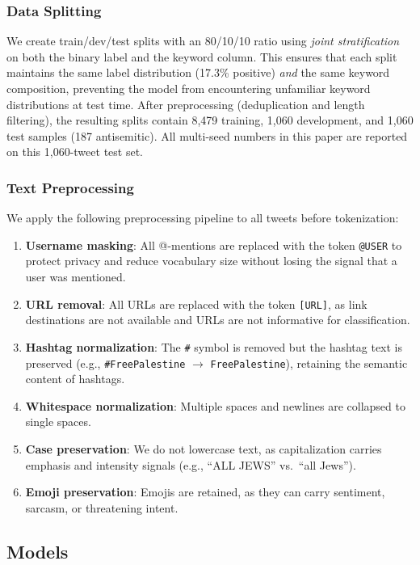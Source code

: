 \documentclass[10pt,a4paper]{article}
\begin{document}
\subsubsection{Data Splitting}

We create train/dev/test splits with an 80/10/10 ratio using \emph{joint stratification} on both the binary label and the keyword column. This ensures that each split maintains the same label distribution (17.3\% positive) \emph{and} the same keyword composition, preventing the model from encountering unfamiliar keyword distributions at test time. After preprocessing (deduplication and length filtering), the resulting splits contain 8{,}479 training, 1{,}060 development, and 1{,}060 test samples (187 antisemitic). All multi-seed numbers in this paper are reported on this 1{,}060-tweet test set.

\subsubsection{Text Preprocessing}

We apply the following preprocessing pipeline to all tweets before tokenization:
\begin{enumerate}[leftmargin=*,itemsep=1pt]
    \item \textbf{Username masking}: All @-mentions are replaced with the token \texttt{@USER} to protect privacy and reduce vocabulary size without losing the signal that a user was mentioned.
    \item \textbf{URL removal}: All URLs are replaced with the token \texttt{[URL]}, as link destinations are not available and URLs are not informative for classification.
    \item \textbf{Hashtag normalization}: The \texttt{\#} symbol is removed but the hashtag text is preserved (e.g., \texttt{\#FreePalestine} $\rightarrow$ \texttt{FreePalestine}), retaining the semantic content of hashtags.
    \item \textbf{Whitespace normalization}: Multiple spaces and newlines are collapsed to single spaces.
    \item \textbf{Case preservation}: We do not lowercase text, as capitalization carries emphasis and intensity signals (e.g., ``ALL JEWS'' vs.\ ``all Jews'').
    \item \textbf{Emoji preservation}: Emojis are retained, as they can carry sentiment, sarcasm, or threatening intent.
\end{enumerate}

\subsection{Models}
\label{sec:models}
\end{document}
